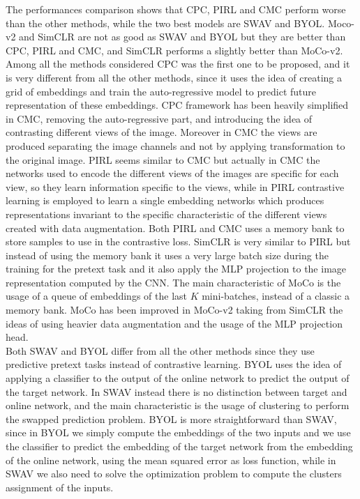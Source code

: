 The performances comparison shows that CPC, PIRL and CMC perform worse than the other methods, while the two best models are SWAV and BYOL. Moco-v2 and SimCLR are not as good as SWAV and BYOL but they are better than CPC, PIRL and CMC, and SimCLR performs a slightly better than MoCo-v2.\\
Among all the methods considered CPC was the first one to be proposed, and it is very different from all the other methods, since it uses the idea of creating a grid of embeddings and train the auto-regressive model to predict future representation of these embeddings. CPC framework has been heavily simplified in CMC, removing the auto-regressive part, and introducing the idea of contrasting different views of the image. Moreover in CMC the views are produced separating the image channels and not by applying transformation to the original image. PIRL seems similar to CMC but actually in CMC the networks used to encode the different views of the images are specific for each view, so they learn information specific to the views, while in PIRL contrastive learning is employed to learn a single embedding networks which produces representations invariant to the specific characteristic of the different views created with data augmentation. Both PIRL and CMC uses a memory bank to store samples to use in the contrastive loss. SimCLR is very similar to PIRL but instead of using the memory bank it uses a very large batch size during the training for the pretext task and it also apply the MLP projection to the image representation computed by the CNN. The main characteristic of MoCo is the usage of a queue of embeddings of the last $K$ mini-batches, instead of a classic a memory bank. MoCo has been improved in MoCo-v2 taking from SimCLR the ideas of using heavier data augmentation and the usage of the MLP projection head.\\
Both SWAV and BYOL differ from all the other methods since they use  predictive pretext tasks instead of contrastive learning. BYOL uses the idea of applying a classifier to the output of the online network to predict the output of the target network. In SWAV instead there is no distinction between target and online network, and the main characteristic is the usage of clustering to perform the swapped prediction problem. BYOL is more straightforward than SWAV, since in BYOL we simply compute the embeddings of the two inputs and we use the classifier to predict the embedding of the target network from the embedding of the online network, using the mean squared error as loss function, while in SWAV we also need to solve the optimization problem to compute the clusters assignment of the inputs.\\
